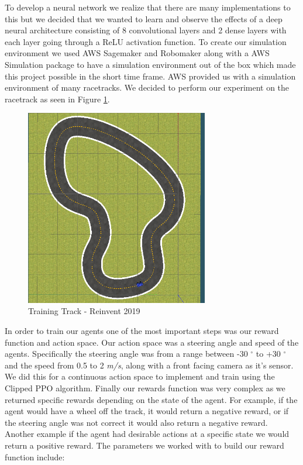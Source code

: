 \documentclass[journal]{IEEEtran}
\begin{document}
To develop a neural network we realize that there are many implementations to this but we decided that we wanted to learn and observe the effects of a deep neural architecture consisting of 8 convolutional layers and 2 dense layers with each layer going through a ReLU activation function.  To create our simulation environment we used AWS Sagemaker and Robomaker along with a AWS Simulation package to have a simulation environment out of the box which made this project possible in the short time frame.  AWS provided us with a simulation environment of many racetracks.  We decided to perform our experiment on the racetrack as seen in Figure \ref{reinvent}.

\begin{figure}[htbp]
\begin{center}
\includegraphics[width=8cm]{training_track}
\end{center}
\vspace{-2mm}
\caption{Training Track - Reinvent 2019}
\label{reinvent}
\end{figure}

In order to train our agents one of the most important steps was our reward function and action space.  Our action space was a steering angle and speed of the agents.  Specifically the steering angle was from a range between -30 $^{\circ}$ to +30 $^{\circ}$ and the speed from 0.5 to 2 \emph{m/s}, along with a front facing camera as it's sensor.  We did this for a continuous action space to implement and train using the Clipped PPO algorithm.  Finally our rewards function was very complex as we returned specific rewards depending on the state of the agent.  For example, if the agent would have a wheel off the track, it would return a negative reward, or if the steering angle was not correct it would also return a negative reward.  Another example if the agent had desirable actions at a specific state we would return a positive reward.  The parameters we worked with to build our reward function include:
\end{document}
